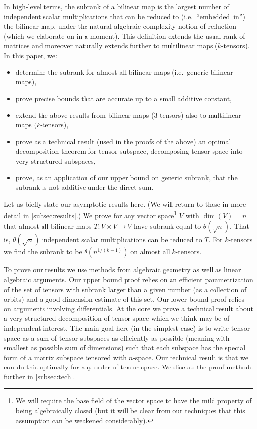 \documentclass[10pt,a4paper]{article}
\theoremstyle{definition}
\theoremstyle{remark}
\begin{document}
In high-level terms, the subrank of a bilinear map is the largest number of independent scalar multiplications that can be reduced to (i.e.~``embedded~in'') the bilinear map, under the natural algebraic complexity notion of reduction (which we elaborate on in a moment). This definition extends the usual rank of matrices and moreover naturally extends further to multilinear maps ($k$-tensors).
In this paper, we:
\begin{itemize}
    \item determine the subrank for almost all bilinear maps (i.e.~generic bilinear maps),
    \item prove precise bounds that are accurate up to a small additive constant,
    \item extend the above results from bilinear maps ($3$-tensors) also to multilinear maps (\mbox{$k$-tensors}),
    \item prove as a technical result (used in the proofs of the above) an optimal decomposition theorem for tensor subspace, decomposing tensor space into very structured subspaces,
    \item prove, as an application of our upper bound on generic subrank, that the subrank is not additive under the direct sum.
\end{itemize} 

Let us biefly state our asymptotic results here. (We will return to these in more detail in \autoref{subsec:results}.) We prove for any vector space\footnote{We will require the base field of the vector space to have the mild property of being algebraically closed (but it will be clear from our techniques that this assumption can be weakened considerably).} $V$ with $\dim(V) = n$ that almost all bilinear maps $T : V \times V \to V$ have subrank equal to $\theta(\sqrt{n})$. That is, $\theta(\sqrt{n})$ independent scalar multiplications can be reduced to $T$. For $k$-tensors we find the subrank to be $\theta(n^{1/(k-1)})$ on almost all $k$-tensors.

%

To prove our results we use methods from algebraic geometry as well as linear algebraic arguments. Our upper bound proof relies on an efficient parametrization of the set of tensors with subrank larger than a given number (as a collection of orbits) and a good dimension estimate of this set.
Our lower bound proof relies on arguments involving differentials. At the core we prove a technical result about a very structured decomposition of tensor space which we think may be of independent interest. The main goal here (in the simplest case) is to write tensor space as a sum of tensor subspaces as efficiently as possible (meaning with smallest as possible sum of dimensions) such that each subspace has the special form of a matrix subspace tensored with $n$-space. Our technical result is that we can do this optimally for any order of tensor space. We discuss the proof methods further in \autoref{subsec:tech}.
%
\end{document}
